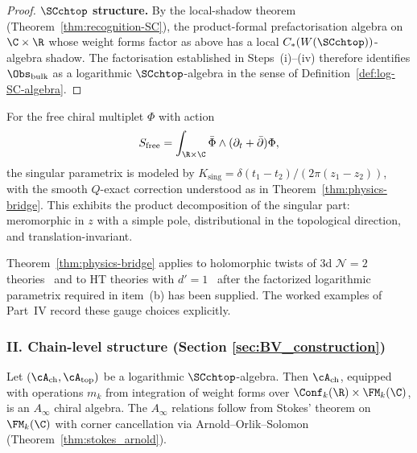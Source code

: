 \begin{proof}
\textbf{$\SCchtop$ structure.} By the local-shadow theorem
(Theorem~\ref{thm:recognition-SC}), the product-formal
prefactorisation algebra on $\C \times \R$ whose weight forms factor
as above has a local $C_\ast(W(\SCchtop))$-algebra shadow. The
factorisation established in Steps~(i)--(iv) therefore identifies
$\Obs_{\mathrm{bulk}}$ as a logarithmic $\SCchtop$-algebra in the
sense of Definition~\ref{def:log-SC-algebra}.
\end{proof}

\begin{example}
\label{ex:free_propagator}
For the free chiral multiplet $\Phi$ with action
\[
S_{\mathrm{free}} = \int_{\R \times \C} \bar{\Phi} \wedge (\partial_t + \bar{\partial}) \Phi,
\]
the singular parametrix is modeled by
$K_{\mathrm{sing}} = \delta(t_1 - t_2)/(2\pi(z_1-z_2))$, with the
smooth $Q$-exact correction understood as in
Theorem~\ref{thm:physics-bridge}. This exhibits the product
decomposition of the singular part: meromorphic in $z$ with a simple
pole, distributional in the topological direction, and
translation-invariant.
\end{example}

\begin{remark}
\label{rem:physical-realisations}
Theorem~\ref{thm:physics-bridge} applies to holomorphic twists of
3d $\mathcal{N}=2$ theories~\cite{CDG20} and to HT theories with
$d'=1$~\cite{GRW21, GKW25} after the factorized logarithmic
parametrix required in item~\textup{(b)} has been supplied. The worked
examples of Part~\textup{IV} record these gauge choices explicitly.
\end{remark}

\subsubsection*{II. Chain-level structure (Section \ref{sec:BV_construction})}

\begin{theorem}
\label{thm:chain_level_structure}
Let $(\cA_{\mathrm{ch}}, \cA_{\mathrm{top}})$ be a logarithmic $\SCchtop$-algebra. Then $\cA_{\mathrm{ch}}$, equipped with operations $m_k$ from integration of weight forms over $\Conf_k(\R) \times \FM_k(\C)$, is an $A_\infty$ chiral algebra. The $A_\infty$ relations follow from Stokes' theorem on $\FM_k(\C)$ with corner cancellation via Arnold--Orlik--Solomon (Theorem~\ref{thm:stokes_arnold}).
\end{theorem}

